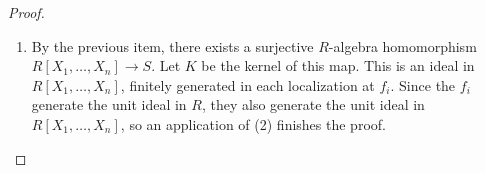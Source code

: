 \begin{proof}
\begin{enumerate}
$y_x\in S$ and $a_x\geq0$, and put $Y_i=\{y_x\mid x\in X_i\}$.
The equalities $y_x/1=f_i^{a_x}x$ and
$x=f_i^{-a_x}(y_x/1)$ show that the images of $Y_i$ generate
the same $R_{f_i}$-subalgebra as $X_i$, because both scalar factors
belong to the base ring $R_{f_i}$. Let $Y$ be the union of the
finite sets $Y_i$; it is finite.
Consider the algebra homomorphism $R[X_y]_{y \in Y} \rightarrow S$
induced by $Y$. Since it is an algebra homomorphism, the image $T$
is an $R$-submodule of the $R$-module $S$, so we can consider the
quotient module $S/T$. By assumption, this is zero if we localize
at the $f_i$, so it is zero by (1) and therefore $S$ is an
$R$-algebra of finite type.
\item By the previous item, there exists a surjective $R$-algebra
homomorphism $R[X_1, \ldots, X_n] \rightarrow S$. Let $K$ be the kernel
of this map. This is an ideal in $R[X_1, \ldots, X_n]$, finitely generated
in each localization at $f_i$. Since the $f_i$ generate the unit ideal
in $R$, they also generate the unit ideal in $R[X_1, \ldots, X_n]$, so an
application of (2) finishes the proof.
\end{enumerate}
\end{proof}